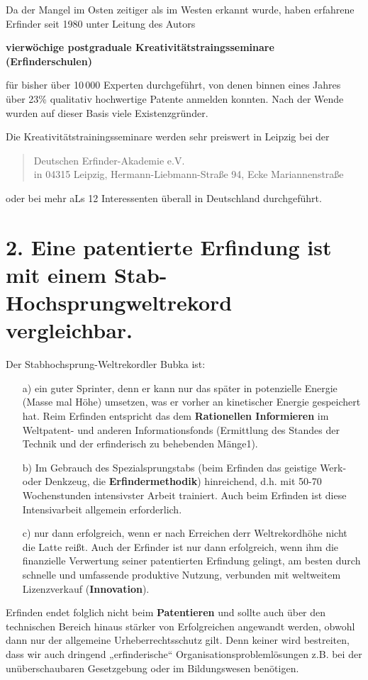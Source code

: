 \documentclass[11pt,a4paper]{article}
\begin{document}
Da der Mangel im Osten zeitiger als im Westen erkannt wurde, haben erfahrene
Erfinder seit 1980 unter Leitung des Autors
\begin{center}\bf
  vierwöchige postgraduale Kreativitätstraingsseminare (Erfinderschulen)
\end{center}
für bisher über 10\,000 Experten durchgeführt, von denen binnen eines Jahres
über 23\% qualitativ hochwertige Patente anmelden konnten. Nach der Wende
wurden auf dieser Basis viele Existenzgründer.

Die Kreativitätstrainingsseminare werden sehr preiswert in Leipzig bei der
\begin{quote}
  Deutschen Erfinder-Akademie e.V.\\
  in 04315 Leipzig, Hermann-Liebmann-Straße 94, Ecke Mariannenstraße 
\end{quote}
oder bei mehr aLs 12 Interessenten überall in Deutschland durchgeführt.

\section*{2. Eine patentierte Erfindung ist mit einem
  Stab-Hochsprung\-welt\-rekord vergleichbar.}

Der Stabhochsprung-Weltrekordler Bubka ist:
\begin{itemize}
\item[a)] ein guter Sprinter, denn er kann nur das später in potenzielle
  Energie (Masse mal Höhe) umsetzen, was er vorher an kinetischer Energie
  gespeichert hat.  Reim Erfinden entspricht das dem \textbf{Rationellen
    Informieren} im Weltpatent- und anderen Informationsfonds (Ermittlung des
  Standes der Technik und der erfinderisch zu behebenden Mänge1).
\item[b)] Im Gebrauch des Spezialsprungstabs (beim Erfinden das geistige Werk-
  oder Denkzeug, die \textbf{Erfindermethodik}) hinreichend, d.h. mit 50-70
  Wochenstunden intensivster Arbeit trainiert.  Auch beim Erfinden ist diese
  Intensivarbeit allgemein erforderlich.
\item[c)] nur dann erfolgreich, wenn er nach Erreichen derr Weltrekordhöhe
  nicht die Latte reißt. Auch der Erfinder ist nur dann erfolgreich, wenn ihm
  die finanzielle Verwertung seiner patentierten Erfindung gelingt, am besten
  durch schnelle und umfassende produktive Nutzung, verbunden mit weltweitem
  Lizenzverkauf (\textbf{Innovation}).
\end{itemize}
Erfinden endet folglich nicht beim \textbf{Patentieren} und sollte auch über
den technischen Bereich hinaus stärker von Erfolgreichen angewandt werden,
obwohl dann nur der allgemeine Urheberrechtsschutz gilt.  Denn keiner wird
bestreiten, dass wir auch dringend „erfinderische“
Organisationsproblemlösungen z.B. bei der unüberschaubaren Gesetzgebung oder im
Bildungswesen benötigen.
\end{document}
